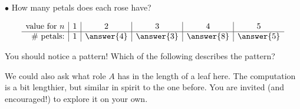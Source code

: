 \documentclass{ximera}
\begin{document}
\begin{exercise}
\begin{exercise}
$\bullet$ How many petals does each rose have?

\[
\begin{array}{r|c|c|c|c|c}
\textrm{value for } n & 1 & 2 & 3 & 4 & 5 \\
\hline
\textrm{\# petals:} & 1 & \answer{4} & \answer{3} & \answer{8} & \answer{5}
\end{array}
\]

\begin{exercise}
You should notice a pattern! Which of the following describes the pattern?
\begin{multipleChoice}
\end{multipleChoice}
\end{exercise}

We could also ask what role $A$ has in the length of a leaf here.  The computation is a bit lengthier, but similar in spirit to the one before.  You are invited (and encouraged!) to explore it on your own.

\end{exercise}
\end{exercise}
\end{document}
